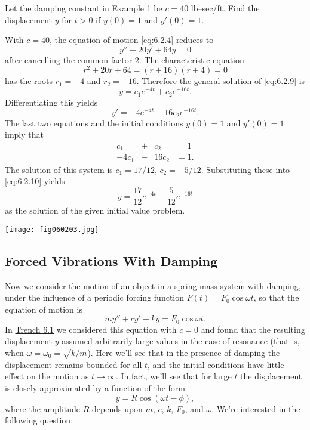 \documentclass{ximera}
\begin{document}
\begin{example}\label{example:6.2.3}
Let the damping constant in Example 1 be $c=40$ lb--sec/ft. Find the
displacement $y$ for $t>0$ if $y(0)=1$ and $y'(0)=1$.
 
\begin{explanation}
With $c=40$, the equation of motion \eqref{eq:6.2.4} reduces to
\begin{equation}\label{eq:6.2.9}
y''+20y'+64y=0
\end{equation}
 after cancelling the  common factor 2.
The characteristic equation
$$
r^2+20r+64=(r+16)(r+4)=0
$$
 has the roots $r_1=-4$ and $r_2=-16$.  Therefore the general
solution of  \eqref{eq:6.2.9} is
\begin{equation}\label{eq:6.2.10}
y=c_1e^{-4t}+c_2e^{-16t}.
\end{equation}
 Differentiating this yields
$$
y'=-4e^{-4t}-16c_2e^{-16t}.
$$
The last two equations and the initial conditions $y(0)=1$ and $y'(0)=1$
imply that
$$
\begin{array}{rlrl}
c_1&+&c_2&=1\\
-4c_1&-&16c_2&=1.
\end{array}
$$
 The solution of this system is $c_1=17/12$, $c_2=-5/12$.
Substituting these into  \eqref{eq:6.2.10} yields
$$
y=\frac{17}{12}e^{-4t}-\frac{5}{12}e^{-16t}
$$
as the solution of the given initial value problem.
 
\begin{image}
  \texttt{[image: fig060203.jpg]}
\end{image}
 
 
\end{explanation}
\end{example}
 
\subsection{Forced Vibrations With Damping}
 
Now we consider the motion of an object in a spring-mass system with
damping, under the influence of a periodic forcing function
$F(t)=F_0\cos\omega t$, so that the equation of motion is
\begin{equation}\label{eq:6.2.11}
my''+cy'+ky=F_0\cos\omega t.
\end{equation}
In \href{https://ximera.osu.edu/ode/main/springProblemsI/springProblemsI}{Trench 6.1} we considered this equation with $c=0$ and
found that the resulting displacement $y$ assumed arbitrarily large
values in the case of resonance   (that is, when
$\omega=\omega_0=\sqrt{k/m}$). Here we'll see that in the presence
of damping the displacement remains bounded for all $t$, and the
initial conditions have little effect on the motion as $t\rightarrow\infty$.
In fact, we'll see that for large $t$ the displacement is closely
approximated by a function of the form
\begin{equation}\label{eq:6.2.12}
y=R\cos(\omega t-\phi),
\end{equation}
where the amplitude $R$ depends upon $m$, $c$, $k$, $F_0$, and
$\omega$. We're interested in the following question:
 
\end{document}
